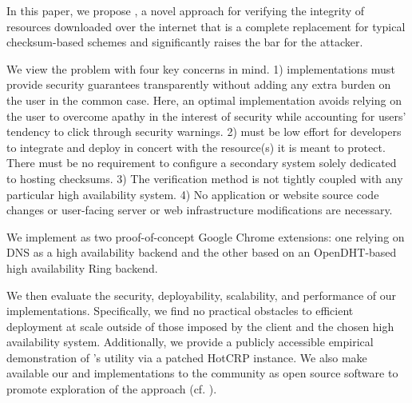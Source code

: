  In this paper, we propose \SYSTEM{}, a novel
approach for verifying the integrity of resources downloaded over the internet
that is a complete replacement for typical checksum-based schemes and
significantly raises the bar for the attacker.

We view the problem with four key concerns in mind. 1) \SYSTEM{} implementations
must provide security guarantees transparently without adding any extra burden
on the user in the common case. Here, an optimal implementation avoids relying
on the user to overcome apathy in the interest of security while accounting for
users' tendency to click through security warnings. 2) \SYSTEM{} must be low
effort for developers to integrate and deploy in concert with the resource(s) it
is meant to protect. There must be no requirement to configure a secondary
system solely dedicated to hosting checksums. 3) The verification method is not
tightly coupled with any particular high availability system. 4) No application
or website source code changes or user-facing server or web infrastructure
modifications are necessary.


 We implement \SYSTEM{} as two
proof-of-concept Google Chrome extensions: one relying on DNS as a high
availability backend and the other based on an OpenDHT-based high availability
Ring backend.




We then evaluate the security, deployability, scalability, and performance of
our implementations. Specifically, we find no practical obstacles to efficient
deployment at scale outside of those imposed by the client and the chosen high
availability system. Additionally, we provide a publicly accessible empirical
demonstration of \SYSTEM{}'s utility via a patched HotCRP instance. We also make
available our \DNSSYS{} and \DHTSYS{} implementations to the community as open
source software to promote exploration of the \SYSTEM{} approach (cf.
).


